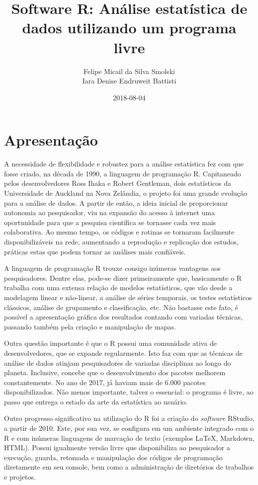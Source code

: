 \documentclass[12pt,brazil,]{book}
\title{Software R: Análise estatística de dados utilizando um programa livre}
\author{Felipe Micail da Silva Smolski \\ Iara Denise Endruweit Battisti}
\date{2018-08-04}
\begin{document}
\maketitle

{
\setcounter{tocdepth}{1}
\tableofcontents
}
\hypertarget{apresentacao}{%
\chapter*{Apresentação}\label{apresentacao}}

A necessidade de flexibilidade e robustez para a análise estatística fez
com que fosse criado, na década de 1990, a linguagem de programação R.
Capitaneado pelos desenvolvedores Ross Ihaka e Robert Gentleman, dois
estatísticos da Universidade de Auckland na Nova Zelândia, o projeto foi
uma grande evolução para a análise de dados. A partir de então, a ideia
inicial de proporcionar autonomia ao pesquisador, viu na expansão do
acesso à internet uma oportunidade para que a pesquisa científica se
tornasse cada vez mais colaborativa. Ao mesmo tempo, os códigos e
rotinas se tornaram facilmente disponibilizáveis na rede, aumentando a
reprodução e replicação dos estudos, práticas estas que podem tornar as
análises mais confiáveis.

A linguagem de programação R trouxe consigo inúmeras vantagens aos
pesquisadores. Dentre elas, pode-se dizer primeiramente que, basicamente
o R trabalha com uma extensa relação de modelos estatísticos, que vão
desde a modelagem linear e não-linear, a análise de séries temporais, os
testes estatísticos clássicos, análise de grupamento e classificação,
etc. Não bastasse este fato, é possível a apresentação gráfica dos
resultados contando com variadas técnicas, passando também pela criação
e manipulação de mapas.

Outra questão importante é que o R possui uma comunidade ativa de
desenvolvedores, que se expande regularmente. Isto faz com que as
técnicas de análise de dados atinjam pesquisadores de variadas
disciplinas ao longo do planeta. Inclusive, concebe que o
desenvolvimento dos pacotes melhorem constantemente. No ano de 2017, já
haviam mais de 6.000 pacotes disponibilizados. Não menos importante,
talvez o essencial: o programa é livre, ao passo que entrega o estado da
arte da estatística ao usuário.

Outro progresso significativo na utilização do R foi a criação do
\emph{software} RStudio, a partir de 2010. Este, por sua vez, se
configura em um ambiente integrado com o R e com inúmeras linguagens de
marcação de texto (exemplos LaTeX, Markdown, HTML). Possui igualmente
versão livre que disponibiliza ao pesquisador a execução, guarda,
retomada e manipulação dos códigos de programação diretamente em seu
console, bem como a administração de diretórios de trabalhos e projetos.
\end{document}
